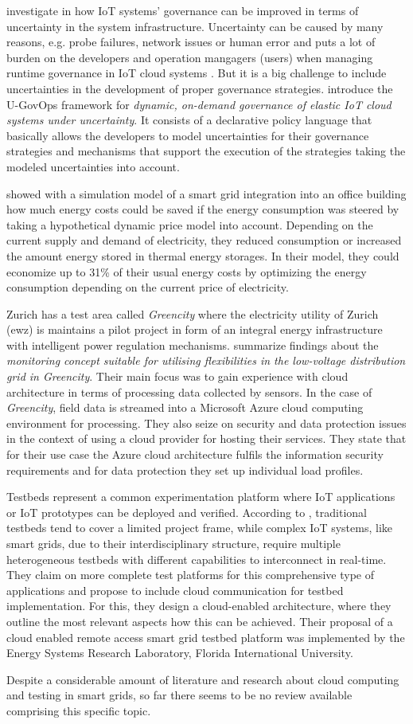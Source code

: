 \citeauthor{7396147} investigate in how IoT systems' governance can be improved in terms of uncertainty in the system infrastructure. Uncertainty can be caused by many reasons, e.g. probe failures, network issues or human error and puts a lot of burden on the developers and operation mangagers (users) when managing runtime governance in IoT cloud systems \cite{7396147}. But it is a big challenge to include uncertainties in the development of proper governance strategies. \citeauthor{7396147} introduce the U-GovOps framework for \textit{dynamic, on-demand governance of elastic IoT cloud systems under uncertainty}. It consists of a declarative policy language that basically allows the developers to model uncertainties for their governance strategies and mechanisms that support the execution of the strategies taking the modeled uncertainties into account.

\citeauthor{bornhoft2013simulation} showed with a simulation model of a smart grid integration into an office building how much energy costs could be saved if the energy consumption was steered by taking a hypothetical dynamic price model into account. Depending on the current supply and demand of electricity, they reduced consumption or increased the amount energy stored in thermal energy storages. In their model, they could economize up to 31\% of their usual energy costs by optimizing the energy consumption depending on the current price of electricity.

Zurich has a test area called \textit{Greencity} where the electricity utility of Zurich (ewz) is maintains a pilot project in form of an integral energy infrastructure with intelligent power regulation mechanisms. \citeauthor{baumgartner2020monitoring} summarize findings about the \textit{monitoring concept suitable for utilising flexibilities in the low-voltage distribution grid in Greencity}. Their main focus was to gain experience with cloud architecture in terms of processing data collected by sensors. In the case of \textit{Greencity}, field data is streamed into a Microsoft Azure cloud computing environment for processing. They also seize on security and data protection issues in the context of using a cloud provider for hosting their services. They state that for their use case the Azure cloud architecture fulfils the information security requirements and for data protection they set up individual load profiles.

Testbeds represent a common experimentation platform where IoT applications or IoT prototypes can be deployed and verified. According to \citeauthor{cintuglu2016cloud}, traditional testbeds tend to cover a limited project frame, while complex IoT systems, like smart grids, due to their interdisciplinary structure, require multiple heterogeneous testbeds with different capabilities to interconnect in real-time. They claim on more complete test platforms for this comprehensive type of applications and propose to include cloud communication for testbed implementation. For this, they design a cloud-enabled architecture, where they outline the most relevant aspects how this can be achieved. Their proposal of a cloud enabled remote access smart grid testbed platform was implemented by the Energy Systems Research Laboratory, Florida International University.

Despite a considerable amount of literature and research about cloud computing and testing in smart grids, so far there seems to be no review available comprising this specific topic.

